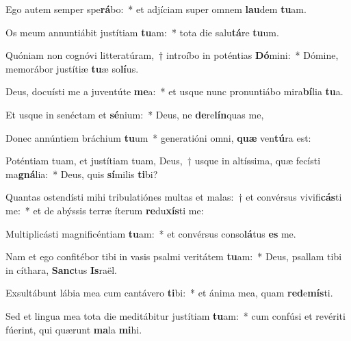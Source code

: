 \item Ego autem semper spe\textbf{rá}bo:~* et adjíciam super omnem \textbf{lau}dem \textbf{tu}am.
\item Os meum annuntiábit justítiam \textbf{tu}am:~* tota die salu\textbf{tá}re \textbf{tu}um.
\item Quóniam non cognóvi litteratúram,~† introíbo in poténtias \textbf{Dó}mini:~* Dómine, memorábor justítiæ \textbf{tu}æ so\textbf{lí}us.
\item Deus, docuísti me a juventúte \textbf{me}a:~* et usque nunc pronuntiábo mira\textbf{bí}lia \textbf{tu}a.
\item Et usque in senéctam et \textbf{sé}nium:~* Deus, ne \textbf{de}re\textbf{lín}quas me,
\item Donec annúntiem bráchium \textbf{tu}um~* generatióni omni, \textbf{quæ} ven\textbf{tú}ra est:
\item Poténtiam tuam, et justítiam tuam, Deus,~† usque in altíssima, quæ fecísti ma\textbf{gná}lia:~* Deus, quis \textbf{sí}milis \textbf{ti}bi?
\item Quantas ostendísti mihi tribulatiónes multas et malas:~† et convérsus vivifi\textbf{cás}ti me:~* et de abýssis terræ íterum \textbf{re}du\textbf{xís}ti me:
\item Multiplicásti magnificéntiam \textbf{tu}am:~* et convérsus conso\textbf{lá}tus \textbf{es} me.
\item Nam et ego confitébor tibi in vasis psalmi veritátem \textbf{tu}am:~* Deus, psallam tibi in cíthara, \textbf{Sanc}tus \textbf{Is}raël.
\item Exsultábunt lábia mea cum cantávero \textbf{ti}bi:~* et ánima mea, quam \textbf{red}e\textbf{mís}ti.
\item Sed et lingua mea tota die meditábitur justítiam \textbf{tu}am:~* cum confúsi et revériti fúerint, qui quærunt \textbf{ma}la \textbf{mi}hi.
